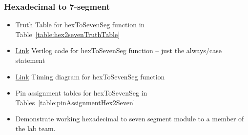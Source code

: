 \subsubsection{Hexadecimal to 7-segment}
\begin{itemize}
\item  Truth Table for hexToSevenSeg function in Table~\ref{table:hex2sevenTruthTable}
\item \protect\hyperlink{Hex2Seven_Verilog}{Link} Verilog code for hexToSevenSeg function -- just the always/case statement
\item \protect\hyperlink{Hex2Seven_Waveform}{Link} Timing diagram for hexToSevenSeg function
\item Pin assignment tables for hexToSevenSeg  in Tables~\ref{table:pinAssignmentHex2Seven}
\item Demonstrate working hexadecimal to seven segment module to a member of the lab team.
\end{itemize}


